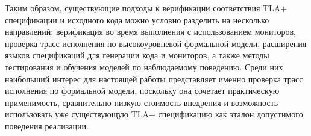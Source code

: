Таким образом, существующие подходы к верификации соответствия TLA+
спецификации и исходного кода можно условно разделить на несколько
направлений: верификация во время выполнения с использованием
мониторов, проверка трасс исполнения по высокоуровневой формальной
модели, расширения языков спецификаций для генерации кода и мониторов,
а также методы тестирования и обучения моделей по наблюдаемому
поведению. Среди них наибольший интерес для настоящей работы
представляет именно проверка трасс исполнения по формальной модели,
поскольку она сочетает практическую применимость, сравнительно низкую
стоимость внедрения и возможность использовать уже существующую TLA+
спецификацию как эталон допустимого поведения реализации.

